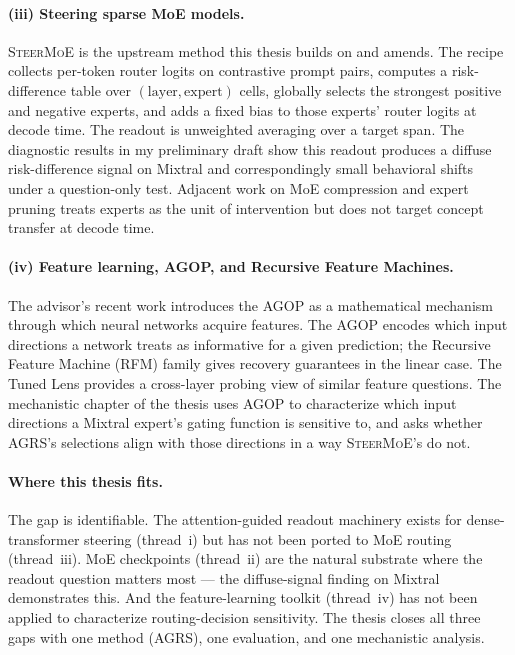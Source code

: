 \documentclass[11pt]{article}
\begin{document}
\paragraph{(iii) Steering sparse MoE models.}
\textsc{SteerMoE} \citep{steermoe2025} is the upstream method
this thesis builds on and amends. The recipe collects per-token
router logits on contrastive prompt pairs, computes a
risk-difference table over $(\text{layer}, \text{expert})$ cells,
globally selects the strongest positive and negative experts, and
adds a fixed bias to those experts' router logits at decode time.
The readout is unweighted averaging over a target span. The
diagnostic results in my preliminary draft show this readout
produces a diffuse risk-difference signal on Mixtral and
correspondingly small behavioral shifts under a question-only
test. Adjacent work on MoE compression and expert pruning
\citep{he2024compression} treats experts as the unit of
intervention but does not target concept transfer at decode time.

\paragraph{(iv) Feature learning, AGOP, and Recursive Feature
Machines.} The advisor's recent work
\citep{radhakrishnan2024mechanism, beaglehole2024mechanism,
radhakrishnan2024rfm} introduces the AGOP as a mathematical
mechanism through which neural networks acquire features. The AGOP
encodes which input directions a network treats as informative for
a given prediction; the Recursive Feature Machine (RFM) family
gives recovery guarantees in the linear case. The Tuned Lens
\citep{belrose2023tunedlens} provides a cross-layer probing view of
similar feature questions. The mechanistic chapter
of the thesis uses AGOP to characterize which input directions a
Mixtral expert's gating function is sensitive to, and asks whether
AGRS's selections align with those directions in a way
\textsc{SteerMoE}'s do not.

\paragraph{Where this thesis fits.}
The gap is identifiable. The attention-guided readout machinery
exists for dense-transformer steering (thread~i) but has not been
ported to MoE routing (thread~iii). MoE checkpoints (thread~ii) are
the natural substrate where the readout question matters most ---
the diffuse-signal finding on Mixtral demonstrates this. And the
feature-learning toolkit (thread~iv) has not been applied to
characterize routing-decision sensitivity. The thesis closes all
three gaps with one method (AGRS), one evaluation, and one
mechanistic analysis.
\end{document}
